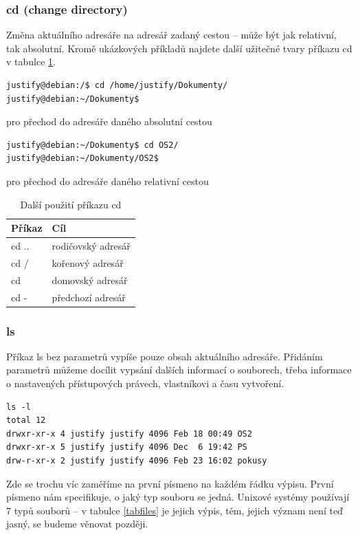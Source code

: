 \documentclass{article}
\begin{document}
\subsubsection{cd (change directory)}
Změna aktuálního adresáře na adresář zadaný cestou -- může být jak relativní, tak absolutní. Kromě ukázkových příkladů najdete další užitečné tvary příkazu cd v tabulce \ref{tabcd}.
\begin{verbatim}
justify@debian:/$ cd /home/justify/Dokumenty/
justify@debian:~/Dokumenty$
\end{verbatim}
pro přechod do adresáře daného absolutní cestou

\begin{verbatim}
justify@debian:~/Dokumenty$ cd OS2/
justify@debian:~/Dokumenty/OS2$
\end{verbatim}
pro přechod do adresáře daného relativní cestou
\begin{table}
\begin{center}
\begin{tabular}{l | l}
Příkaz & Cíl\\
\hline
cd .. & rodičovský adresář\\
cd / & kořenový adresář\\
cd & domovský adresář\\
cd - & předchozí adresář\\
\end{tabular}
\end{center}
\caption{Další použití příkazu cd}
\label{tabcd}
\end{table}

\subsubsection{ls}
Příkaz ls bez parametrů vypíše pouze obsah aktuálního adresáře. Přidáním parametrů můžeme docílit vypsání dalších informací o souborech, třeba informace o nastavených přístupových právech, vlastníkovi a času vytvoření.

\begin{verbatim}
ls -l
total 12
drwxr-xr-x 4 justify justify 4096 Feb 18 00:49 OS2
drwxr-xr-x 5 justify justify 4096 Dec  6 19:42 PS
drw-r-xr-x 2 justify justify 4096 Feb 23 16:02 pokusy
\end{verbatim}
Zde se trochu víc zaměříme na první písmeno na každém řádku výpisu. První písmeno nám specifikuje, o jaký typ souboru se jedná. Unixové systémy používají 7 typů souborů -- v tabulce \ref{tabfiles} je jejich výpis, těm, jejich význam není teď jasný, se budeme věnovat později.
\end{document}
